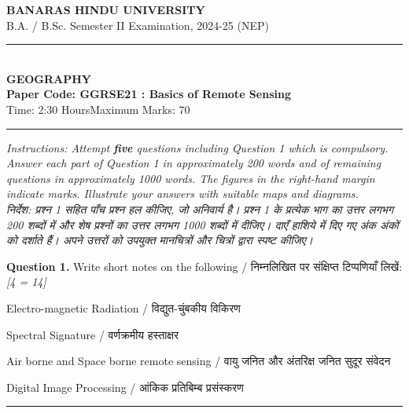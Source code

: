 \documentclass[11pt,a4paper]{article}
\newcommand{\pts}[1]{\hfill   \textit{[#1]}}
\begin{document}
\begin{center}
  {\large\bfseries BANARAS HINDU UNIVERSITY}\\[2pt]
  {\normalsize B.A. / B.Sc. Semester II Examination, 2024-25 (NEP)}\\[6pt]
  \rule{0.8\linewidth}{0.5pt}\\[6pt]
  {\large\bfseries GEOGRAPHY}\\[4pt]
  {\large\bfseries Paper Code: GGRSE21 : Basics of Remote Sensing}\\[4pt]
  {\normalsize Time: 2:30 Hours\hfill Maximum Marks: 70}
\end{center}

\rule{\linewidth}{0.4pt}

\smallskip



\noindent   \textit{Instructions: Attempt   \textbf{five} questions including Question 1 which is compulsory. Answer each part of Question 1 in approximately 200 words and of remaining questions in approximately 1000 words. The figures in the right-hand margin indicate marks. Illustrate your answers with suitable maps and diagrams.}\\[4pt]



\noindent   \textit{निर्देश: प्रश्न 1 सहित पाँच प्रश्न हल कीजिए, जो अनिवार्य है। प्रश्न 1 के प्रत्येक भाग का उत्तर लगभग 200 शब्दों में और शेष प्रश्नों का उत्तर लगभग 1000 शब्दों में दीजिए। दाएँ हाशिये में दिए गए अंक अंकों को दर्शाते हैं। अपने उत्तरों को उपयुक्त मानचित्रों और चित्रों द्वारा स्पष्ट कीजिए।}

\bigskip




\noindent   \textbf{Question 1.} Write short notes on the following / निम्नलिखित पर संक्षिप्त टिप्पणियाँ लिखें:\pts{4   = 14}

\begin{parts}
  \item Electro-magnetic Radiation / विद्युत-चुंबकीय विकिरण
  \item Spectral Signature / वर्णक्रमीय हस्ताक्षर
  \item Air borne and Space borne remote sensing / वायु जनित और अंतरिक्ष जनित सुदूर संवेदन
  \item Digital Image Processing / आंकिक प्रतिबिम्ब प्रसंस्करण
\end{parts}

\medskip\rule{\linewidth}{0.2pt}\medskip
\end{document}
